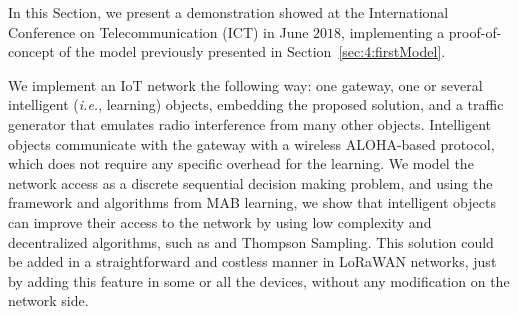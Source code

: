 

In this Section, we present a demonstration showed at the International Conference on Telecommunication (ICT) in June $2018$, implementing a proof-of-concept of the model previously presented in Section~\ref{sec:4:firstModel}.

We implement an IoT network the following way: one gateway, one or several intelligent (\emph{i.e.}, learning) objects, embedding the proposed solution,
and a traffic generator that emulates radio interference from many other objects.
Intelligent objects communicate with the gateway with a wireless ALOHA-based protocol, which does not require any specific overhead for the learning.
%
We model the network access as a discrete sequential decision making problem, and using the framework and algorithms from MAB learning, we show that intelligent objects can improve their access to the network by using low complexity and decentralized algorithms, such as \UCB{} and Thompson Sampling.
%
This solution could be added in a straightforward and costless manner in LoRaWAN networks, just by adding this feature in some or all the devices, without any modification on the network side.





